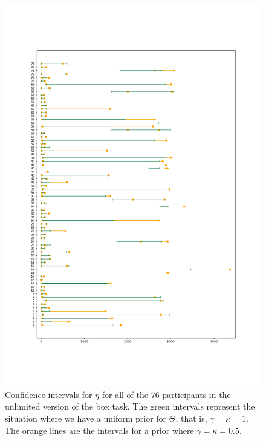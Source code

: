 \begin{figure}
    \centering
    \includegraphics[scale=0.37]{pictures/Sensitivity/ci_unlim_eta_pdf.pdf}
    \caption[CIs for $\eta$ for all participants with two different priors, unlimited]{
    Confidence intervals for $\eta$ for all of the 76 participants in the unlimited version of the box task. The green intervals represent the situation where we have a uniform prior for $\Theta$, that is, $\gamma=\kappa=1$. The orange lines are the intervals for a prior where $\gamma=\kappa=0.5$.}
    \label{fig:sensitivity_unlim_cis_eta}
\end{figure}
